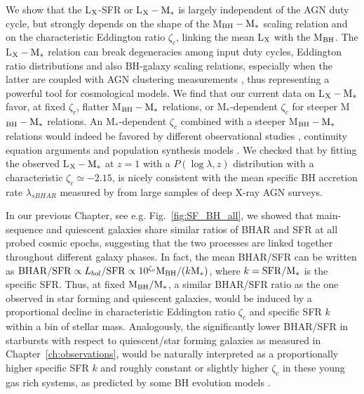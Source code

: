 We show that the L$_{\rm X}$-SFR or L$_{\rm X}-{\rm M}_*$ is largely independent of the AGN duty cycle, but strongly depends on the shape of the M$_{\rm BH}-{\rm M}_*$ scaling relation and on the characteristic Eddington ratio $\zeta_c$, linking the mean L$_{\rm X}$ with the M$_{\rm BH}$. The L$_{\rm X}-{\rm M}_*$ relation can break degeneracies among input duty cycles, Eddington ratio distributions and also BH-galaxy scaling relations, especially when the latter are coupled with AGN clustering measurements \citep{ShankarNat}, thus representing a powerful tool for cosmological models. 
We find that our current data on L$_{\rm X}-{\rm M}_*$ favor, at fixed $\zeta_c$, flatter M$_{\rm BH}-{\rm M}_*$ relations, or M$_*$-dependent $\zeta_c$ for steeper M$_{\rm BH}-{\rm M}_*$ relations. An M$_*$-dependent $\zeta_c$ combined with a steeper M$_{\rm BH}-{\rm M}_*$ relations would indeed be favored by different observational studies \citep[][and Fig.~\ref{fig:comp_models}]{2019ApJ...885L..36D, 2019MNRAS.484.4360A}, continuity equation arguments \citep{Shankar13Acc,Aversa15} and population synthesis models \citep{2018MNRAS.476..436B}. We checked that by fitting the observed L$_{\rm X}-{\rm M}_*$ at $z=1$ with a $P(\log \lambda, z)$ distribution with a characteristic $\zeta_c\simeq-2.15$, is nicely consistent with the mean specific BH accretion rate $\lambda_{sBHAR}$ measured by \citet{2019MNRAS.484.4360A} from large samples of deep X-ray AGN surveys.

In our previous Chapter, see e.g. Fig.~\ref{fig:SF_BH_all}, we showed that main-sequence and quiescent galaxies share similar ratios of BHAR and SFR at all probed cosmic epochs, suggesting that the two processes are linked together throughout different galaxy phases.  
In fact, the mean BHAR/SFR can be written as ${\rm BHAR/SFR} \propto L_{bol}/{\rm SFR} \propto 10^{\zeta_c} {\rm M}_{\rm BH}/(k {\rm M}_*)$, where $k={\rm SFR}/{\rm M}_*$ is the specific SFR. Thus, at fixed ${\rm M}_{\rm BH}/{\rm M}_*$, a similar BHAR/SFR ratio as the one observed in star forming and quiescent galaxies, would be induced by a proportional decline in characteristic Eddington ratio $\zeta_c$ and specific SFR $k$ within a bin of stellar mass. Analogously, the significantly lower BHAR/SFR in starbursts with respect to quiescent/star forming galaxies as measured in Chapter~\ref{ch:observations}, would be naturally interpreted as a proportionally higher specific SFR $k$ %
and roughly constant or slightly higher $\zeta_c$ in these young gas rich systems, as predicted by some BH evolution models \citep[e.g.,][]{Aversa15}.